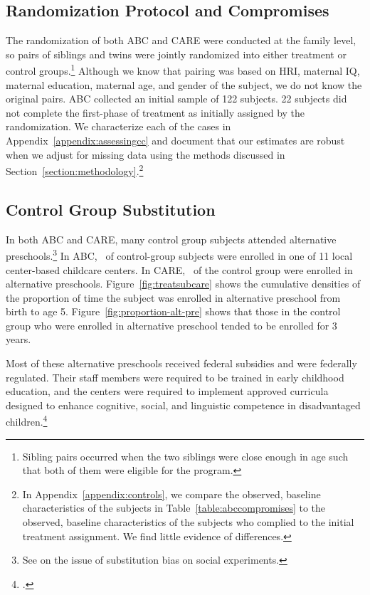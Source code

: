 \subsection{Randomization Protocol and Compromises} \label{section:randomization}

The randomization of both ABC and CARE were conducted at the family level, so pairs of siblings and twins were jointly randomized into either treatment or control groups.\footnote{Sibling pairs occurred when the two siblings were close enough in age such that both of them were eligible for the program.} Although we know that pairing was based on HRI, maternal IQ, maternal education, maternal age, and gender of the subject, we do not know the original pairs. ABC collected an initial sample of 122 subjects. 22 subjects did not complete the first-phase of treatment as initially assigned by the randomization. We characterize each of the cases in Appendix~\ref{appendix:assessingcc} and document that our estimates are robust when we adjust for missing data using the methods discussed in Section~\ref{section:methodology}.\footnote{In Appendix~\ref{appendix:controls}, we compare the observed, baseline characteristics of the subjects in Table~\ref{table:abccompromises} to the observed, baseline characteristics of the subjects who complied to the initial treatment assignment. We find little evidence of differences.}


\subsection{Control Group Substitution}

In both ABC and CARE, many control group subjects attended alternative preschools.\footnote{See \cite{Heckman_Hohmann_etal_2000_QJE} on the issue of substitution bias on social experiments.} In ABC, \treatsubsabc\ of control-group subjects were enrolled in one of 11 local center-based childcare centers. In CARE, \treatsubscarec\ of the control group were enrolled in alternative preschools. Figure~\ref{fig:treatsubcare} shows the cumulative densities of the proportion of time the subject was enrolled in alternative preschool from birth to age 5. Figure~\ref{fig:proportion-alt-pre} shows that those in the control group who were enrolled in alternative preschool tended to be enrolled for 3 years.

Most of these alternative preschools received federal subsidies and were federally regulated. Their staff members were required to be trained in early childhood education, and the centers were required to implement approved curricula designed to enhance cognitive, social, and linguistic competence in disadvantaged children.\footnote{\citet{Burchinal_etal_1989_CD_Daycare-Pre-K-Dev}.} 

